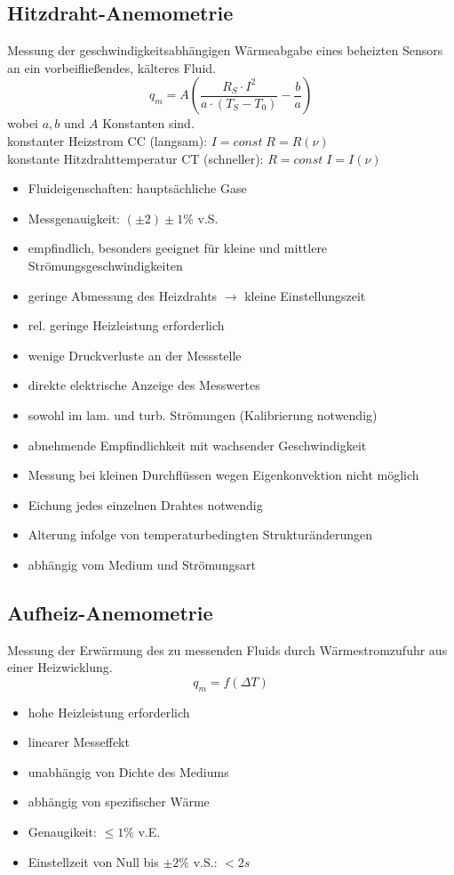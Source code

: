 \subsection{Hitzdraht-Anemometrie}
Messung der geschwindigkeitsabhängigen Wärmeabgabe eines beheizten Sensors an ein vorbeifließendes, kälteres Fluid.
$$q_m = A \left( \frac{R_S \cdot I^2}{a\cdot (T_S-T_0)}-\frac{b}{a}\right)$$
wobei $a,b$ und $A$ Konstanten sind.\\
konstanter Heizstrom CC (langsam): $I=const \; R=R(\nu)$\\
konstante Hitzdrahttemperatur CT (schneller): $R=const \; I=I(\nu)$
\begin{itemize}
\item Fluideigenschaften: hauptsächliche Gase
\item Messgenauigkeit: $(\pm 2) \pm 1 \%$ v.S.
\end{itemize}
\begin{itemize}[label=$+$]
\item empfindlich, besonders geeignet für kleine und mittlere Strömungsgeschwindigkeiten
\item geringe Abmessung des Heizdrahts $\rightarrow$ kleine Einstellungszeit
\item rel. geringe Heizleistung erforderlich
\item wenige Druckverluste an der Messstelle
\item direkte elektrische Anzeige des Messwertes
\item sowohl im lam. und turb. Strömungen (Kalibrierung notwendig)
\end{itemize}
\begin{itemize}[label=$-$]
\item abnehmende Empfindlichkeit mit wachsender Geschwindigkeit
\item Messung bei kleinen Durchflüssen wegen Eigenkonvektion nicht möglich
\item Eichung jedes einzelnen Drahtes notwendig
\item Alterung infolge von temperaturbedingten Strukturänderungen
\item abhängig vom Medium und Strömungsart
\end{itemize}
\subsection{Aufheiz-Anemometrie}
Messung der Erwärmung des zu messenden Fluids durch Wärmestromzufuhr aus einer Heizwicklung.
$$q_m=f(\Delta T)$$
\begin{itemize}
\item hohe Heizleistung erforderlich
\item linearer Messeffekt
\item unabhängig von Dichte des Mediums
\item abhängig von spezifischer Wärme
\item Genaugikeit: $\leq 1 \%$ v.E.
\item Einstellzeit von Null bis $\pm 2 \%$ v.S.: $< 2\unit{s}$
\end{itemize}


